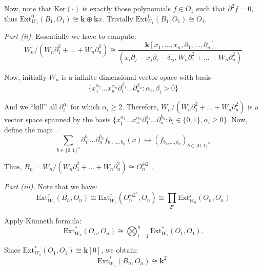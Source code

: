 \documentclass{category-template}
\begin{document}
Now, note that $\text{Ker}(\cdot)$ is exactly those polynomials $f \in O_1$ such
that $\partial^2f=0$, thus $\text{Ext}_{W_1}^0(B_1, O_1) \cong \mathbf{k} \oplus
\mathbf{k}x$. Trivially $\text{Ext}_{W_1}^1(B_1, O_1) \cong O_1$.

\textit{Part (ii).} Essentially we have to compute:
\begin{equation*}
    W_n / (W_n\partial_1^2 + \dots + W_n\partial_n^2) \cong \frac{\mathbf{k}[x_1,\dots,x_n,\partial_1,\dots,\partial_n]}{(x_i\partial_j - x_j\partial_i - \delta_{ij}, W_n\partial_1^2 + \dots + W_n\partial_n^2)}
\end{equation*}

Now, initially $W_n$ is a infinite-dimensional vector space with basis 
\begin{equation*}
    \{x_1^{\alpha_1}\dots x_n^{\alpha_n}\partial_1^{\beta_1}\dots \partial_n^{\beta_n}: \alpha_i, \beta_i > 0\}
\end{equation*}

And we ``kill'' all $\partial_i^{\alpha_i}$ for which $\alpha_i \geq 2$.
Therefore, $W_n / (W_n\partial_1^2 + \dots + W_n\partial_n^2)$ is a vector space
spanned by the basis $\{x_1^{\alpha_1}\dots x_n^{\alpha_n}\partial_1^{b_1}\dots
\partial_n^{b_n}: b_i \in \{0,1\}, \alpha_i \geq 0\}$. Now, define the map:
\begin{equation*}
    \sum_{b \in \{0,1\}^n} \partial_1^{b_1}\dots \partial_n^{b_n}f_{b_1,\dots,b_n}(x) \mapsto (f_{b_1,\dots,b_n})_{b \in \{0,1\}^n}
\end{equation*}

Thus, $B_n = W_n/(W_n\partial_1^2 + \dots + W_n\partial_n^2) \cong O_n^{\oplus 2^n}$.

\textit{Part (iii).} Note that we have:
\begin{equation*}
    \text{Ext}^j_{W_n}(B_n, O_n) \cong \text{Ext}^j_{W_n}(O_n^{\oplus 2^n}, O_n) \cong \prod_{2^n}\text{Ext}^j_{W_n}(O_n, O_n)
\end{equation*}

Apply Künneth formula:
\begin{equation*}
    \text{Ext}_{W_n}^*(O_n, O_n) \cong \bigotimes_{i=1}^n \text{Ext}_{W_1}^*(O_1, O_1).
\end{equation*}

Since $\text{Ext}_{W_1}^*(O_1, O_1) \cong \mathbf{k}[0]$, we obtain:
\begin{equation*}
    \text{Ext}^j_{W_n}(B_n, O_n) \cong \mathbf{k}^{2^n}
\end{equation*}
\end{document}
